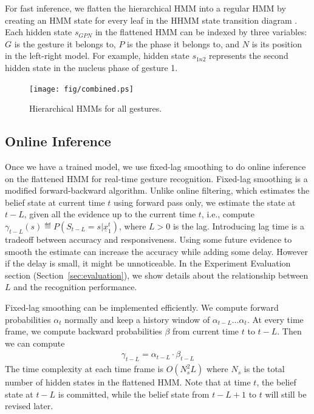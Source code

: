 For fast inference, we
flatten the hierarchical HMM into a regular HMM by creating an HMM state for
every leaf in the HHMM state transition diagram \cite{murphy02}. Each
hidden state $s_{GPN}$ in the flattened HMM can be indexed by three variables:
$G$ is the gesture it belongs to, $P$ is the phase it belongs to, and $N$ is its
position in the left-right model. For example, hidden state $s_{1n2}$ represents the
second hidden state in the nucleus phase of gesture 1.

\begin{figure}[t]
\centering
\texttt{[image: fig/combined.ps]}
\caption{Hierarchical HMMs for all gestures.}
\label{fig:combined}
\end{figure}

\subsection{Online Inference}
Once we have a trained model, we use fixed-lag smoothing \cite{murphy02} to do
online inference on the flattened HMM for real-time gesture recognition.
Fixed-lag smoothing is a modified forward-backward algorithm. Unlike online
filtering, which estimates the belief state at current time $t$ using forward
pass only, we estimate the state at $t - L$, given all the evidence up to the
current time $t$, i.e., compute $\gamma_{t - L}(s) \eqdef P(S_{t -
L} = s|\underline{x}_1^t)$, where $L > 0$ is the lag. Introducing lag time is a
tradeoff between accuracy and responsiveness. Using some future evidence to
smooth the estimate can increase the accuracy while adding some delay. However
if the delay is small, it might be unnoticeable.
In the Experiment Evaluation section (Section~\ref{sec:evaluation}), we show
details about the relationship between $L$ and the recognition performance.

Fixed-lag smoothing can be implemented efficiently. We compute forward
probabilities $\alpha_t$ normally and keep a history window of $\alpha_{t -
L}\ldots\alpha_t$. At every time frame, we compute backward probabilities
$\beta$ from current time $t$ to $t - L$. Then we can compute
\begin{align}
\gamma_{t - L} = \alpha_{t - L} \cdot \beta_{t - L}
\end{align}  
The time complexity at each time frame is $O(N_s^2L)$ where $N_s$ is the total
number of hidden states in the flattened HMM. Note that at time $t$, the belief
state at $t - L$ is committed, while the belief state from $t - L + 1$ to $t$ will still be revised later.

